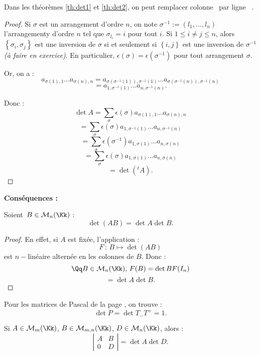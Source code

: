 \documentclass[class=report,crop=false]{standalone}
\newcommand{\exoo}{\emph{(à faire en exercice)}}
\begin{document}
\begin{corollaire}
Dans les théorèmes \ref{th:det1} et \ref{th:det2}, on peut remplacer \og colonne \fg\ par \og ligne \fg\ . 
\end{corollaire}

\begin{proof}
Si $\sigma$ est un arrangement d'ordre $n$, on note $\sigma^{-1}:= (l_1,...,l_n)$ l'arrangementy d'ordre $n$ tel que $\sigma_{l_i} = i$ pour tout $i$. Si $1 \le i \neq j \le n$, alors $\left\{\sigma_i,\sigma_j\right\}$ est une inversion de $\sigma$ si et seulement si $\left\{i,j\right\}$ est une inversion de $\sigma^{-1}$ \exoo . En particulier, $\epsilon(\sigma) = \epsilon(\sigma^{-1})$ pour tout arrangement $\sigma$. 

Or, on a :
\[a_{\sigma(1),1}...a_{\sigma(n),n} =a_{\sigma(\sigma^{-1}(1)),\sigma^{-1}(1)}...a_{\sigma(\sigma^{-1}(n)),\sigma^{-1}(n)} \]
\[= a_{1,\sigma^{-1}(1)}...a_{n,\sigma^{-1}(n)} .\]

Donc :
\[\det A = \sum_{\sigma} \epsilon(\sigma) a_{\sigma(1),1}...a_{\sigma(n),n}\]
\[=  \sum_{\sigma} \epsilon(\sigma) a_{1,\sigma^{-1}(1)}...a_{n,\sigma^{-1}(n)}\]
\[= \sum_{\sigma} \epsilon(\sigma^{-1}) a_{1,\sigma(1)}...a_{n,\sigma(n)}\]
\[=\sum_{\sigma} \epsilon(\sigma) a_{1,\sigma(1)}...a_{n,\sigma(n)}\]
\[= \det ({}^tA) .\]


\end{proof}
{\bf Conséquences :}

\begin{theoreme}
Soient $\,B \in \mathcal{M}_n(\Kk)$ : \[\det(AB) = \det A \det B .\]
\end{theoreme}
\begin{proof}
En effet, si $A$ est fixée, l'application : 
\[F \,:\, B \mapsto \det(AB)\]
est $n-$linéaire alternée en les colonnes de $B$. Donc :
\[\Qq B \in \mathcal{M}_n(\Kk),\, F(B) = \det B F(I_n)\]
\[=\det A \det B .\] 
\end{proof}

\begin{exemple}
Pour les matrices de Pascal de la page \pageref{matdeP}, on trouve : \[\det P = \det T_-T^+ = 1 .\]
\end{exemple}

\begin{proposition}
Si $A \in \mathcal{M}_m(\Kk)$, $B \in \mathcal{M}_{m,n}(\Kk)$, $D \in \mathcal{M}_{n}(\Kk)$, alors :
\[\left|\begin{array}{c|c}
A & B\\
\hline 
0 & D
\end{array}\right| = \det A \det D .\]
\end{proposition}
\end{document}
